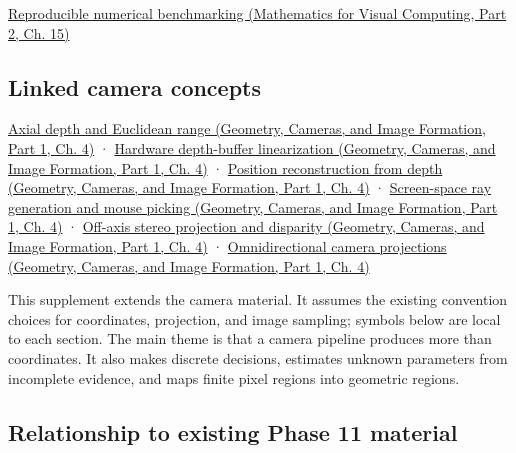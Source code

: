 \href{../02-Mathematics-for-Visual-Computing-P02/main.pdf\#02-foundations-ii-ch031-test-numerical-methods-and-benchmark-reproducibly}{Reproducible numerical benchmarking (Mathematics for Visual Computing, Part 2, Ch. 15)}

\subsection{Linked camera concepts}\label{02-foundations-ii-ch039-linked-camera-concepts}

\hypertarget{02-foundations-ii-ch039-linked-camera-concepts}{}

\href{../03-Geometry-Cameras-and-Image-Formation-P01/main.pdf\#02-foundations-ii-ch035-recover-geometry-from-depth-and-construct-screen-space-rays}{Axial depth and Euclidean range (Geometry, Cameras, and Image Formation, Part 1, Ch. 4)} · \href{../03-Geometry-Cameras-and-Image-Formation-P01/main.pdf\#02-foundations-ii-ch035-recover-geometry-from-depth-and-construct-screen-space-rays}{Hardware depth-buffer linearization (Geometry, Cameras, and Image Formation, Part 1, Ch. 4)} · \href{../03-Geometry-Cameras-and-Image-Formation-P01/main.pdf\#02-foundations-ii-ch035-recover-geometry-from-depth-and-construct-screen-space-rays}{Position reconstruction from depth (Geometry, Cameras, and Image Formation, Part 1, Ch. 4)} · \href{../03-Geometry-Cameras-and-Image-Formation-P01/main.pdf\#02-foundations-ii-ch035-recover-geometry-from-depth-and-construct-screen-space-rays}{Screen-space ray generation and mouse picking (Geometry, Cameras, and Image Formation, Part 1, Ch. 4)} · \href{../03-Geometry-Cameras-and-Image-Formation-P01/main.pdf\#02-foundations-ii-ch035-build-projection-and-stereo-geometry-around-real-camera-baselines}{Off-axis stereo projection and disparity (Geometry, Cameras, and Image Formation, Part 1, Ch. 4)} · \href{../03-Geometry-Cameras-and-Image-Formation-P01/main.pdf\#02-foundations-ii-ch035-represent-directions-over-the-full-sphere}{Omnidirectional camera projections (Geometry, Cameras, and Image Formation, Part 1, Ch. 4)}

This supplement extends the camera material. It assumes the existing convention choices for coordinates, projection, and image sampling; symbols below are local to each section. The main theme is that a camera pipeline produces more than coordinates. It also makes discrete decisions, estimates unknown parameters from incomplete evidence, and maps finite pixel regions into geometric regions.

\subsection{Relationship to existing Phase 11 material}\label{02-foundations-ii-ch039-relationship-to-existing-phase-11-material}

